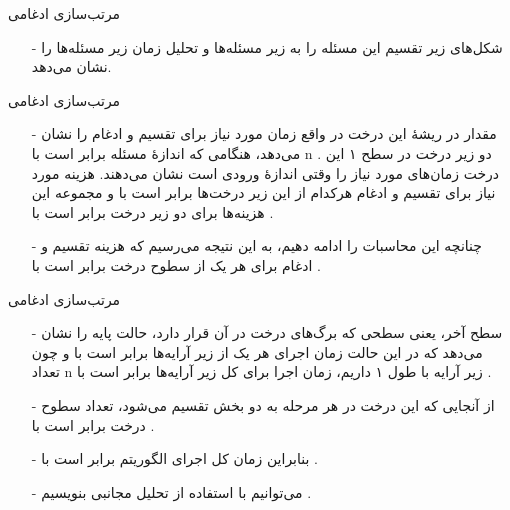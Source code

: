 \begin{frame}{‌مرتب‌سازی ادغامی}
\begin{itemize}\itemr
\item[-]
شکل‌های زیر تقسیم این مسئله را به زیر مسئله‌ها و تحلیل زمان زیر مسئله‌ها را نشان می‌دهد.
\end{itemize}
\end{frame}


\begin{frame}{‌مرتب‌سازی ادغامی}
\begin{itemize}\itemr
\item[-]
مقدار
در ریشهٔ این درخت در واقع زمان مورد نیاز برای تقسیم و ادغام را نشان می‌دهد، هنگامی که اندازهٔ مسئله برابر است با n . دو زیر درخت در سطح ۱ این درخت زمان‌های مورد نیاز را وقتی اندازهٔ ورودی
است نشان می‌دهند. هزینه مورد نیاز برای تقسیم و ادغام هر‌کدام از این زیر درخت‌ها برابر است با
و مجموعه این هزینه‌ها برای دو زیر درخت برابر است با
.
\item[-]
چنانچه این محاسبات را ادامه دهیم، به این نتیجه می‌رسیم که هزینه تقسیم و ادغام برای هر یک از سطوح درخت برابر است با
.
\end{itemize}
\end{frame}


\begin{frame}{‌مرتب‌سازی ادغامی}
\begin{itemize}\itemr
\item[-]
سطح آخر، یعنی سطحی که برگ‌های درخت در آن قرار دارد، حالت پایه را نشان می‌دهد که در این حالت زمان اجرای هر یک از زیر آرایه‌ها برابر است با
و چون تعداد n زیر آرایه با طول ۱ داریم، زمان اجرا برای کل زیر آرایه‌ها برابر است با
.
\item[-]
از آنجایی که این درخت در هر مرحله به دو بخش تقسیم می‌شود، تعداد سطوح درخت برابر است با
.
\item[-]
بنابراین زمان کل اجرای الگوریتم برابر است با
 .
\item[-]
می‌توانیم با استفاده از تحلیل مجانبی بنویسیم
.
\end{itemize}
\end{frame}

